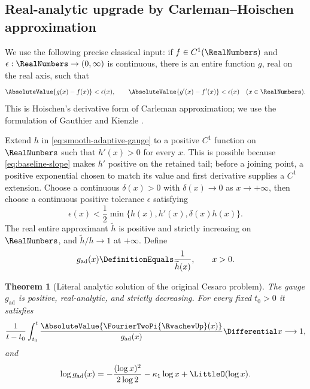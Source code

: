 \documentclass[11pt,oneside]{article}
\numberwithin{equation}{section}
\newtheorem{theorem}{Theorem}[section]
\theoremstyle{definition}
\theoremstyle{remark}
\begin{document}
\subsection{Real-analytic upgrade by Carleman--Hoischen approximation}

We use the following precise classical input: if $f\in C^1(\RealNumbers)$ and
$\epsilon:\RealNumbers\to(0,\infty)$ is continuous, there is an entire function $g$, real on the
real axis, such that
\begin{equation}
 \AbsoluteValue{g(x)-f(x)}<\epsilon(x),
 \qquad \AbsoluteValue{g'(x)-f'(x)}<\epsilon(x)
 \quad(x\in\RealNumbers).
 \label{eq:Hoischen}
\end{equation}
This is Hoischen's derivative form of Carleman approximation; we use the formulation of
Gauthier and Kienzle \cite{gauthier-kienzle}.

Extend $h$ in \eqref{eq:smooth-adaptive-gauge} to a positive $C^1$ function on $\RealNumbers$
such that $h'(x)>0$ for every $x$.  This is possible because
\eqref{eq:baseline-slope} makes $h'$ positive on the retained tail; before a joining point,
a positive exponential chosen to match its value and first derivative supplies a $C^1$
extension.  Choose a continuous $\delta(x)>0$ with $\delta(x)\to0$ as $x\to+\infty$,
then choose a continuous positive tolerance $\epsilon$ satisfying
\begin{equation}
 \epsilon(x)<\frac12\min\{h(x),h'(x),\delta(x)h(x)\}.
 \label{eq:Hoischen-error}
\end{equation}
The real entire approximant $\widetilde h$ is positive and strictly increasing on $\RealNumbers$,
and $\widetilde h/h\to1$ at $+\infty$.  Define
\begin{equation}
 g_{\mathrm{ad}}(x)\DefinitionEquals\frac1{\widetilde h(x)},
 \qquad x>0.
 \label{eq:g-adaptive}
\end{equation}

\begin{theorem}[Literal analytic solution of the original Cesaro problem]
\label{thm:analytic-adaptive}
The gauge $g_{\mathrm{ad}}$ is positive, real-analytic, and strictly decreasing.  For every
fixed $t_0>0$ it satisfies
\begin{equation}
 \frac1{t-t_0}\int_{t_0}^{t}
 \frac{\AbsoluteValue{\FourierTwoPi{\RvachevUp}(x)}}{g_{\mathrm{ad}}(x)}\Differential x\longrightarrow1,
 \label{eq:adaptive-exact-limit}
\end{equation}
and
\begin{equation}
 \log g_{\mathrm{ad}}(x)
 =-\frac{(\log x)^2}{2\log2}-\kappa_1\log x+\LittleO(\log x).
 \label{eq:adaptive-rough-scale}
\end{equation}
\end{theorem}
\end{document}
